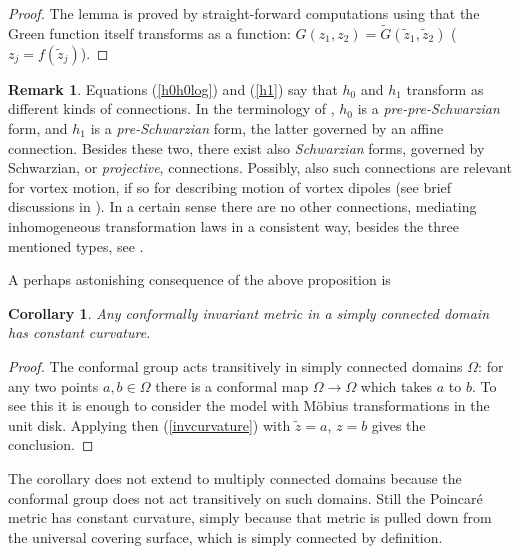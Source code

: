 \documentclass[reqno,12pt]{article}
\theoremstyle{plain}
\newtheorem{corollary}[thm]{Corollary}
\theoremstyle{definition}
\newtheorem{remark}[defn]{Remark}
\numberwithin{equation}{section}
\numberwithin{figure}{section}
\begin{document}
\begin{proof}
The lemma is proved by straight-forward computations using that the Green function itself transforms as a function:
$G(z_1,z_2)=\tilde{G}(\tilde{z}_1,\tilde{z}_2)$  ($z_j=f(\tilde{z}_j)$).
\end{proof}

\begin{remark}\label{rem:connections}
Equations (\ref{h0h0log}) and (\ref{h1}) say that $h_0$ and $h_1$ transform as different kinds of connections. 
In the terminology of \cite{Kang-Makarov-2013}, $h_0$ is a {\it pre-pre-Schwarzian} form, and $h_1$ is a {\it pre-Schwarzian}
form, the latter governed by an affine connection. Besides these two, there exist also {\it Schwarzian} forms, 
governed by Schwarzian, or {\it projective}, connections. Possibly, also such connections are  relevant for vortex motion, if so
for describing motion of vortex dipoles (see brief discussions in \cite{Gustafsson-2019}).  In a certain sense there
are no other connections, mediating inhomogeneous transformation laws in a consistent way, besides the three mentioned types, 
see \cite{Gunning-1966, Gunning-1967}.
\end{remark}

A perhaps astonishing consequence of the above proposition is
\begin{corollary}\label{cor:curvature}
Any conformally invariant metric in a simply connected domain has constant curvature.
\end{corollary}

\begin{proof}
The conformal group acts transitively in simply connected domains $\Omega$: for any two points
$a,b\in\Omega$ there is a conformal map $\Omega\to\Omega$ which takes $a$ to $b$. To see this
it is enough to consider the model with M\"obius transformations in the unit disk. Applying then (\ref{invcurvature}) with
$\tilde{z}=a$, $z=b$ gives the conclusion.
\end{proof}

The corollary does not extend to multiply connected domains because the conformal group does not act transitively on such domains.
Still the Poincar\'{e} metric has constant curvature, simply because that metric is pulled down from the universal covering
surface, which is simply connected by definition.
\end{document}
